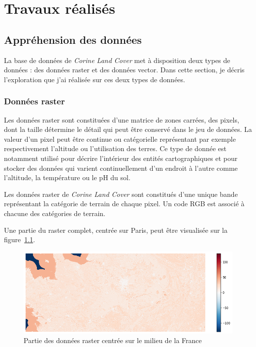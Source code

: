 \chapter{Travaux réalisés}


\section{Appréhension des données}


La base de données de \emph{Corine Land Cover} met à disposition deux types de données : des données raster et des données vector.
Dans cette section, je décris l'exploration que j'ai réalisée sur ces deux types de données.

\subsection{Données raster}

Les données raster sont constituées d'une matrice de zones carrées, des pixels, dont la taille détermine le détail qui peut être conservé dans le jeu de données.
La valeur d'un pixel peut être continue ou catégorielle représentant par exemple respectivement l'altitude ou l'utilisation des terres.
Ce type de donnée est notamment utilisé pour décrire l'intérieur des entités cartographiques et pour stocker des données qui varient continuellement d'un endroit à l'autre comme l'altitude, la température ou le pH du sol.


Les données raster de \emph{Corine Land Cover} sont constitués d'une unique bande représentant la catégorie de terrain de chaque pixel.
Un code RGB est associé à chacune des catégories de terrain.

Une partie du raster complet, centrée sur Paris, peut être visualisée sur la figure~\ref{fig:raster}.

\begin{figure}[!h]
    \centering
    \includegraphics[scale=0.5]{images/raster}
    \caption{Partie des données raster centrée sur le milieu de la France}
    \label{fig:raster}
\end{figure}

